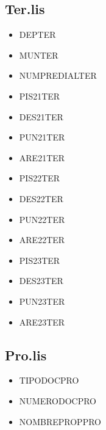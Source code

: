 \documentclass[letterpaper,10pt,spanish]{sphinxmanual}
\begin{document}
\subsection{Ter.lis}
\label{\detokenize{ETL_Cobol/Structure:ter-lis}}\begin{itemize}
\item {} 
DEP\sphinxhyphen{}TER

\item {} 
MUN\sphinxhyphen{}TER

\item {} 
NUM\sphinxhyphen{}PREDIAL\sphinxhyphen{}TER

\item {} 
PIS21\sphinxhyphen{}TER

\item {} 
DES21\sphinxhyphen{}TER

\item {} 
PUN21\sphinxhyphen{}TER

\item {} 
ARE21\sphinxhyphen{}TER

\item {} 
PIS22\sphinxhyphen{}TER

\item {} 
DES22\sphinxhyphen{}TER

\item {} 
PUN22\sphinxhyphen{}TER

\item {} 
ARE22\sphinxhyphen{}TER

\item {} 
PIS23\sphinxhyphen{}TER

\item {} 
DES23\sphinxhyphen{}TER

\item {} 
PUN23\sphinxhyphen{}TER

\item {} 
ARE23\sphinxhyphen{}TER

\end{itemize}


\subsection{Pro.lis}
\label{\detokenize{ETL_Cobol/Structure:pro-lis}}\begin{itemize}
\item {} 
TIPO\sphinxhyphen{}DOC\sphinxhyphen{}PRO

\item {} 
NUMERO\sphinxhyphen{}DOC\sphinxhyphen{}PRO

\item {} 
NOMBRE\sphinxhyphen{}PROP\sphinxhyphen{}PRO

\end{itemize}
\end{document}
